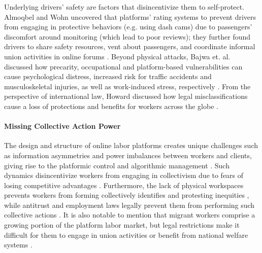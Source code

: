 Underlying drivers' safety are factors that disincentivize them to self-protect. Almoqbel and Wohn uncovered that platforms' rating systems to prevent drivers from engaging in protective behaviors (e.g. using dash cams) due to passengers' discomfort around monitoring (which lead to poor reviews); they further found drivers to share safety resources, vent about passengers, and coordinate informal union activities in online forums \cite{Almoqbel2019-in}. Beyond physical attacks, Bajwa et. al. discussed how precarity, occupational and platform-based vulnerabilities can cause psychological distress, increased risk for traffic accidents and musculoskeletal injuries, as well as work-induced stress, respectively \cite{Bajwa2018-gy}. From the  perspective of international law, Howard discussed how legal misclassifications cause a loss of protections and benefits for workers across the globe \cite{Howard2017-wd}.


\paragraph{Missing Collective Action Power}
The design and structure of online labor platforms creates unique challenges such as information asymmetries and power imbalances between workers and clients, giving rise to the platformic control and algorithmic management \cite{power_struggles,Jarrahi2019-if, precarity, platform_manage,Gray2019-ue, power, Rosenblat_Stark_2016}. 
Such dynamics disincentivize workers from engaging in collectivism due to fears of losing competitive advantages \cite{atom}. Furthermore, the lack of physical workspaces prevents workers from forming collectively identifies and protesting inequities \cite{chesta2019labour, end}, while antitrust and employment laws legally prevent them from performing such collective actions \cite{anwar2020precarity, paul2019fissuring}. It is also notable to mention that migrant workers comprise a growing portion of the platform labor market, but legal restrictions make it difficult for them to engage in union activities or benefit from national welfare systems \cite{van2020migration}.

